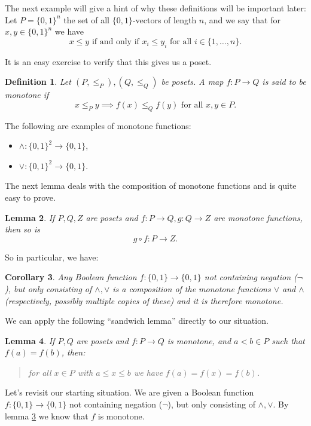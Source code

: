 \documentclass[12pt]{amsart}
\newtheorem{lemma}{\bf Lemma}[section]
\newtheorem{corollary}[lemma]{\bf Corollary}
\newtheorem{definition}[lemma]{\bf Definition}
\begin{document}
The next example will give a hint of why these definitions will 
be important later: Let $P = \{0,1\}^n$ the set of all $\{0,1\}$-vectors
of length $n$, and we say that for $x,y\in \{0,1\}^n$ we have
$$x \leq y \text{ if and only if } 
x_i \leq y_i \text{ for all }i\in\{1,\ldots,n\}.$$

It is an easy exercise to verify that this gives us a poset.

\begin{definition} Let $(P, \leq_P), (Q, \leq_Q)$ be posets. 
A map $f:P\to Q$ is said to be {\em monotone} if
$$x\leq_P y \implies f(x)\leq_Q f(y) \text{ for all }x,y\in P.$$
\end{definition}

The following are examples of monotone functions:
\begin{itemize}
    \item $\land: \{0,1\}^2\to \{0,1\}$, 
    \item $\lor: \{0,1\}^2\to \{0,1\}$.
\end{itemize}

The next lemma deals with the composition of monotone functions and 
is quite easy to prove. 

\begin{lemma} If $P, Q, Z$ are posets and $f: P\to Q, g: Q\to Z$ are 
monotone functions, then so is $$g\circ f: P\to Z.$$
\end{lemma}

So in particular, we have:

\begin{corollary}\label{andor_lemma}
Any Boolean function $f:\{0,1\}\to \{0,1\}$ not containing negation ($\neg$),
but only consisting of $\land, \lor$ is a composition of the monotone 
functions $\lor$ and $\land$ (respectively, possibly multiple copies of these)
and it is therefore {\em monotone}.
\end{corollary}

We can apply the following ``sandwich lemma'' directly to our situation.

\begin{lemma}\label{sandwich_lemma} 
If $P, Q$ are posets and $f:P\to Q$ is monotone, and 
$a<b \in P$ such that $f(a) = f(b)$, then:
\begin{quote}
for all $x\in P$ with $a\leq x \leq b$ we have $f(a) = f(x) = f(b)$. 
\end{quote}
\end{lemma}

Let's revisit our starting situation. We are given a 
Boolean function $f:\{0,1\}\to \{0,1\}$ not containing negation ($\neg$),
but only consisting of $\land, \lor$. By lemma \ref{andor_lemma} we 
know that $f$ is monotone.
\end{document}

